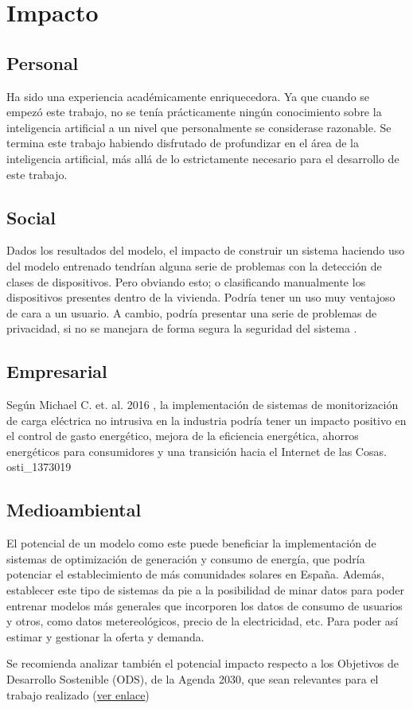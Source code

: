 \section{Impacto}
\subsection{Personal}
Ha sido una experiencia académicamente enriquecedora. Ya que cuando se empezó este trabajo, no se tenía prácticamente ningún conocimiento sobre la inteligencia artificial a un nivel que personalmente se considerase razonable. Se termina este trabajo habiendo disfrutado de profundizar en el área de la inteligencia artificial, más allá de lo estrictamente necesario para el desarrollo de este trabajo. 
\subsection{Social}
Dados los resultados del modelo, el impacto de construir un sistema haciendo uso del modelo entrenado tendrían alguna serie de problemas con la detección de clases de dispositivos. Pero obviando esto; o clasificando manualmente los dispositivos presentes dentro de la vivienda. Podría tener un uso muy ventajoso de cara a un usuario. 
A cambio, podría presentar una serie de problemas de privacidad, si no se manejara de forma segura la seguridad del sistema \autocite{osti_2229911}.
\subsection{Empresarial}
Según Michael C. et. al. 2016 \autocite{osti_1373019}, la implementación de sistemas de monitorización de carga eléctrica no intrusiva en la industria podría tener un impacto positivo en el control de gasto energético, mejora de la eficiencia energética, ahorros energéticos para consumidores y una transición hacia el Internet de las Cosas. osti_1373019
\subsection{Medioambiental}
El potencial de un modelo como este puede beneficiar la implementación de sistemas de optimización de generación y consumo de energía, que podría potenciar el establecimiento de más comunidades solares en España. Además, establecer este tipo de sistemas da pie a la posibilidad de minar datos para poder entrenar modelos más generales que incorporen los datos de consumo de usuarios y otros, como datos metereológicos, precio de la electricidad, etc. Para poder así estimar y gestionar la oferta y demanda. 

Se recomienda analizar también el potencial impacto respecto a los Objetivos de Desarrollo Sostenible (ODS), de la Agenda 2030, que sean relevantes para el trabajo realizado (\href{https://www.un.org/sustainabledevelopment/es/objetivos-de-desarrollo-sostenible/}{ver enlace})
